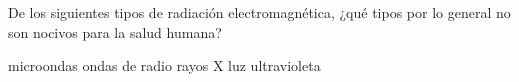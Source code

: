 De los siguientes tipos de radiación electromagnética, ¿qué tipos por lo general no son nocivos para la salud humana?

\begin{oneparcheckboxes}
    \CorrectChoice microondas
    \CorrectChoice ondas de radio
    \choice rayos X
    \choice luz ultravioleta
\end{oneparcheckboxes}